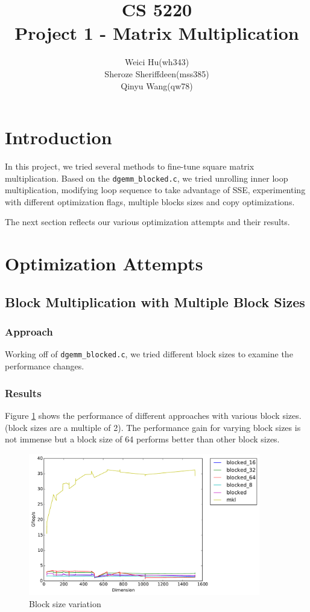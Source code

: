 \documentclass[11pt]{article}
\theoremstyle{plain}
\theoremstyle{definition}
\begin{document}
\title{CS 5220\\ Project 1 - Matrix Multiplication}
\author{Weici Hu(wh343)\\ Sheroze Sheriffdeen(mss385)\\ Qinyu Wang(qw78)}
\maketitle

\section{Introduction}

In this project, we tried several methods to fine-tune square matrix multiplication.
Based on the \texttt{dgemm\_blocked.c}, we tried unrolling inner loop multiplication, modifying loop sequence to take advantage of SSE, experimenting with different optimization flags, multiple blocks sizes and copy optimizations. 

The next section reflects our various optimization attempts and their results. 

\section{Optimization Attempts}
\subsection{Block Multiplication with Multiple Block Sizes}
\subsubsection{Approach}
Working off of \texttt{dgemm\_blocked.c}, we tried different block sizes to examine the performance changes. 
\subsubsection{Results}
Figure \ref{pow_2_blocks} shows the performance of different approaches with various block sizes. (block sizes are a multiple of 2). The performance gain for varying block sizes is not immense but a block size of 64 performs better than other block sizes. \\

\begin{figure}[H]
    \includegraphics[width=0.9\textwidth]{timing_block_size_changes.pdf}
    \caption{Block size variation}
    \label{pow_2_blocks}
\end{figure} 
\end{document}
